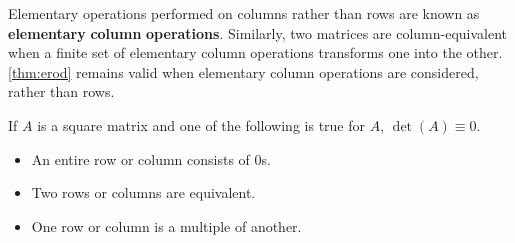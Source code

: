 \begin{theorem}
    Elementary operations performed on columns rather than rows are known as \textbf{elementary} \textbf{column} \textbf{operations}. Similarly, two matrices are column-equivalent when a finite set of elementary column operations transforms one into the other. \ref{thm:erod} remains valid when elementary column operations are considered, rather than rows.
\end{theorem}
\begin{theorem}
    If \(A\) is a square matrix and one of the following is true for \(A\), \(\det(A)\equiv 0\).
    \begin{itemize}
        \item An entire row or column consists of \(0\)s. 
        \item Two rows or columns are equivalent. 
        \item One row or column is a multiple of another.
    \end{itemize}
\end{theorem}
